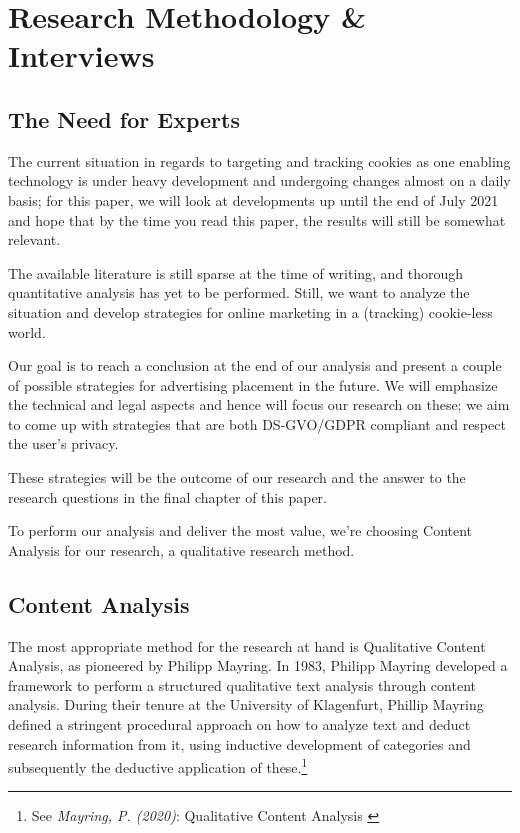 %
%

\pagebreak
\section{Research Methodology \& Interviews}

\onehalfspacing

\subsection{The Need for Experts}

The current situation in regards to targeting and tracking cookies as one enabling technology is under heavy development and undergoing changes almost on a daily basis; for this paper, we will look at developments up until the end of July 2021 and hope that by the time you read this paper, the results will still be somewhat relevant.

The available literature is still sparse at the time of writing, and thorough quantitative analysis has yet to be performed. Still, we want to analyze the situation and develop strategies for online marketing in a (tracking) cookie-less world.

Our goal is to reach a conclusion at the end of our analysis and present a couple of possible strategies for advertising placement in the future. We will emphasize the technical and legal aspects and hence will focus our research on these; we aim to come up with strategies that are both DS-GVO/GDPR compliant and respect the user's privacy.

These strategies will be the outcome of our research and the answer to the research questions in the final chapter of this paper.

To perform our analysis and deliver the most value, we're choosing Content Analysis for our research, a qualitative research method.

\subsection{Content Analysis}

The most appropriate method for the research at hand is Qualitative Content Analysis, as pioneered by Philipp Mayring. In 1983, Philipp Mayring developed a framework to perform a structured qualitative text analysis through content analysis. During their tenure at the University of Klagenfurt, Phillip Mayring defined a stringent procedural approach on how to analyze text and deduct research information from it, using inductive development of categories and subsequently the deductive application of these.\footnote{See \textit{Mayring, P. (2020)}: Qualitative Content Analysis \cite{qualiContent}}


